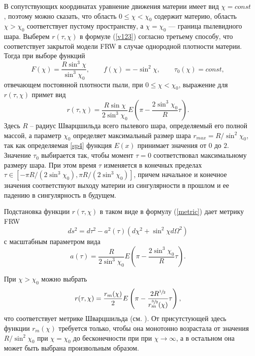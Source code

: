 \documentclass[12pt]{article}
\newcommand{\bq}{\begin{equation}}
\newcommand{\eq}{\end{equation}}
\begin{document}
В сопутствующих координатах уравнение движения материи имеет вид $\chi = const$, поэтому можно сказать, что область $0 \leqslant \chi < \chi_0$ содержит материю, область $\chi > \chi_0$ соответствует пустому пространству, а $\chi = \chi_0$ --- граница пылевидного шара.
Выберем $r(\tau, \chi)$ в формуле (\ref{v123}) согласно третьему способу, что соответствует закрытой модели FRW в случае однородной плотности материи.
Тогда при выборе функций
\bq
F(\chi) = \frac{R \sin^3{\chi}}{\sin^3{\chi_0}}, \qquad f(\chi) = -\sin^2{\chi}, \qquad \tau_0(\chi) = const,
\eq
отвечающем постоянной плотности пыли, при $0 \leqslant \chi < \chi_0$, выражение для $r(\tau, \chi)$ примет вид
\bq\label{sp14}
	r(\tau, \chi) = \frac{R \sin{\chi}}{2 \sin^3{\chi_0}}  E \left( \pi - \frac{2 \sin^3{\chi_0}}{R} \tau \right).
\eq
Здесь $R$ -- радиус Шварцшильда всего пылевого шара, определяемый его полной массой, а
параметр $\chi_0$ определяет максимальный размер шара $r_{max} = R/\sin^2{\chi_0}$,
так как определяемая \eqref{sp4} функция $E(x)$ принимает значения от $0$ до $2$.
Значение $\tau_0$ выбирается так, чтобы момент $\tau = 0$ соответствовал максимальному размеру шара.
При этом время $\tau$ изменяется в конечных пределах $\tau\in [-\pi R/(2\sin^3{\chi_0}),\pi R/(2\sin^3{\chi_0})]$,
причем начальное и конечное значения соответствуют выходу материи из сингулярности в прошлом и ее падению в сингулярность в будущем.

Подстановка функции $r(\tau, \chi)$ в таком виде в формулу (\ref{metric}) дает метрику FRW
\bq\label{sp19}
ds^2 = d\tau^2 - a^2(\tau) \left(d\chi^2 + \sin^2{\chi}d\Omega^2 \right)
\eq
с масштабным параметром вида
\bq\label{spp1}
a(\tau) = \frac{R}{2 \sin^3{\chi_0}} E \left( \pi - \frac{2 \sin^3{\chi_0}}{R} \tau \right).
\eq

При $\chi > \chi_0$ можно выбрать
\bq\label{spp1a}
r(\tau, \chi) = \frac{r_m(\chi)}{2} E \left( \pi - \frac{2R^{\sfrac{1}{2}}}{r^{\sfrac{3}{2}}_m(\chi)} \tau \right),
\eq
что соответствует метрике Шварцшильда (см. \cite{landavshic2,novfrol}).
От присутстующей здесь функции $r_m(\chi)$ требуется только, чтобы она монотонно возрастала
от значения $R/\sin^2{\chi_0}$ при $\chi=\chi_0$ до бесконечности при при $\chi \to \infty$,
а в остальном она может быть выбрана произвольным образом.
\end{document}
